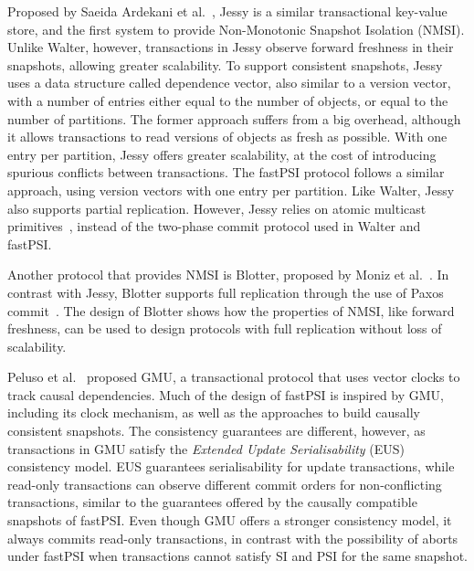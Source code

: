 
Proposed by Saeida Ardekani et al.~\citep{ardekani_nmsi}, Jessy is a similar transactional key-value store, and the first system to provide Non-Monotonic Snapshot Isolation (NMSI). Unlike Walter, however, transactions in Jessy observe forward freshness in their snapshots, allowing greater scalability. To support consistent snapshots, Jessy uses a data structure called dependence vector, also similar to a version vector, with a number of entries either equal to the number of objects, or equal to the number of partitions. The former approach suffers from a big overhead, although it allows transactions to read versions of objects as fresh as possible. With one entry per partition, Jessy offers greater scalability, at the cost of introducing spurious conflicts between transactions. The fastPSI protocol follows a similar approach, using version vectors with one entry per partition. Like Walter, Jessy also supports partial replication. However, Jessy relies on atomic multicast primitives~\citep{guerraoui_multicast}, instead of the two-phase commit protocol used in Walter and fastPSI.

Another protocol that provides NMSI is Blotter, proposed by Moniz et al.~\citep{moniz_blotter}. In contrast with Jessy, Blotter supports full replication through the use of Paxos commit~\citep{gray_paxos_commit}. The design of Blotter shows how the properties of NMSI, like forward freshness, can be used to design protocols with full replication without loss of scalability.

Peluso et al.~\citep{peluso_gmu} proposed GMU, a transactional protocol that uses vector clocks to track causal dependencies. Much of the design of fastPSI is inspired by GMU, including its clock mechanism, as well as the approaches to build causally consistent snapshots. The consistency guarantees are different, however, as transactions in GMU satisfy the \emph{Extended Update Serialisability} (EUS)~\citep{hansdah_update_ser, adya_thesis} consistency model. EUS guarantees serialisability for update transactions, while read-only transactions can observe different commit orders for non-conflicting transactions, similar to the guarantees offered by the causally compatible snapshots of fastPSI. Even though GMU offers a stronger consistency model, it always commits read-only transactions, in contrast with the possibility of aborts under fastPSI when transactions cannot satisfy SI and PSI for the same snapshot.
